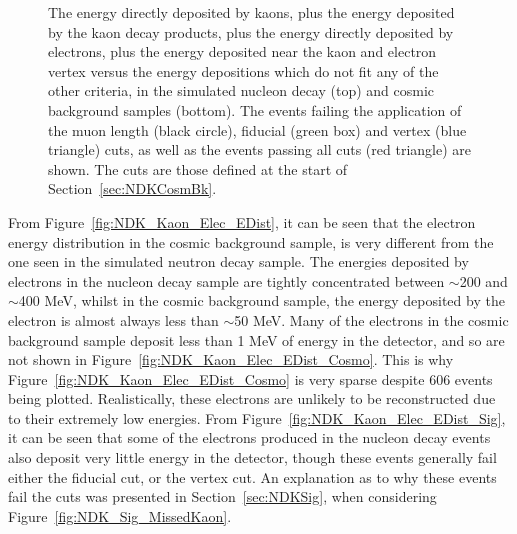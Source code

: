 \begin{figure}
          {The energy directly deposited by kaons, plus the energy deposited by the kaon decay products, plus the energy directly deposited by electrons, plus the energy deposited near the kaon and electron vertex versus the energy depositions which do not fit any of the other criteria, in the simulated nucleon decay (top) and cosmic background samples (bottom). The events failing the application of the muon length (black circle), fiducial (green box) and vertex (blue triangle) cuts, as well as the events passing all cuts (red triangle) are shown. The cuts are those defined at the start of Section~\ref{sec:NDKCosmBk}.}
  \label{fig:NDK_AllEDep_Other_EDist}
\end{figure}

From Figure~\ref{fig:NDK_Kaon_Elec_EDist}, it can be seen that the electron energy distribution in the cosmic background sample, is very different from the one seen in the simulated neutron decay sample. The energies deposited by electrons in the nucleon decay sample are tightly concentrated between $\sim$200 and $\sim$400 MeV, whilst in the cosmic background sample, the energy deposited by the electron is almost always less than $\sim$50 MeV. Many of the electrons in the cosmic background sample deposit less than 1 MeV of energy in the detector, and so are not shown in Figure~\ref{fig:NDK_Kaon_Elec_EDist_Cosmo}. This is why Figure~\ref{fig:NDK_Kaon_Elec_EDist_Cosmo} is very sparse despite 606 events being plotted. Realistically, these electrons are unlikely to be reconstructed due to their extremely low energies. From Figure~\ref{fig:NDK_Kaon_Elec_EDist_Sig}, it can be seen that some of the electrons produced in the nucleon decay events also deposit very little energy in the detector, though these events generally fail either the fiducial cut, or the vertex cut. An explanation as to why these events fail the cuts was presented in Section~\ref{sec:NDKSig}, when considering Figure~\ref{fig:NDK_Sig_MissedKaon}. \\

